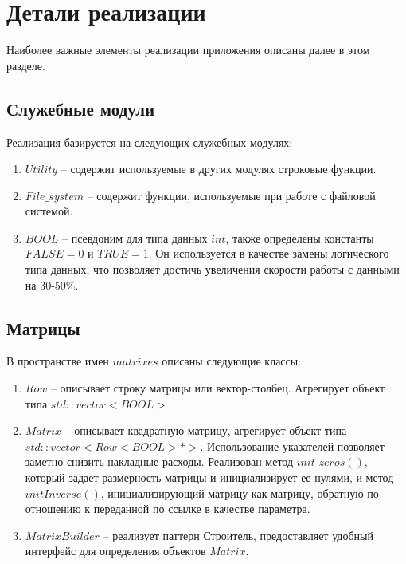 
	
\section{Детали реализации} \label{ch2:sec-abbr} %
	
Наиболее важные элементы реализации приложения описаны далее в этом разделе. 	

\subsection{Служебные модули} \label{ch2:subsec-title-abbr} %

Реализация базируется на следующих служебных модулях:
\begin{enumerate}[1.]
	\item \(Utility\) -- содержит используемые в других модулях строковые функции.
	\item \(File\_system\) -- содержит функции, используемые при работе с файловой системой.
	\item \(BOOL\) -- псевдоним для типа данных \(int\), также определены константы  \(FALSE = 0\)  и  \(TRUE = 1\).  Он используется в качестве замены логического типа данных, что позволяет достичь увеличения скорости работы с данными на 30-50\%.
\end{enumerate} 

			
\subsection{Матрицы} \label{ch2:subsec-title-abbr} %

В пространстве имен \(matrixes\) описаны следующие классы:
\begin{enumerate}[1.]
	\item \(Row\) -- описывает строку матрицы или вектор-столбец. Агрегирует объект типа \(std::vector<BOOL>\).
	\item \(Matrix\) -- описывает квадратную матрицу, агрегирует объект типа \(std::vector<Row<BOOL> *>\). Использование указателей позволяет заметно снизить накладные расходы. Реализован метод \(init\_zeros()\), который задает размерность матрицы и инициализирует ее нулями, и метод \(initInverse()\), инициализирующий матрицу как матрицу, обратную по отношению к переданной по ссылке в качестве параметра.
	\item \(MatrixBuilder\) -- реализует паттерн Строитель, предоставляет удобный интерфейс для определения объектов \(Matrix\).
\end{enumerate} 

